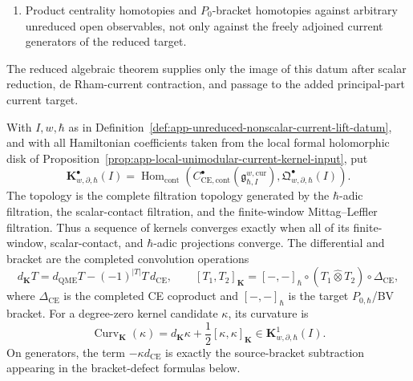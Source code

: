\begin{defn}
\begin{enumerate}
    filtered chain projection
    \[
      \widehat\sigma_{\mathrm{sc}}\colon
      \mathfrak Q^\bullet_{w,\partial,\hbar}(I)
      \longrightarrow
      C^\bullet_{\mathrm{Lie}}(\bar A;\C\gamma_{\mathbf 1})[1][[\hbar]]
    \]
    whose associated graded is the scalar-symbol map of
    Definition~\ref{def:app-scalar-obstruction-complex}.
    \item Product centrality homotopies and \(P_0\)-bracket homotopies
    against arbitrary unreduced open observables, not only against the
    freely adjoined current generators of the reduced target.
  \end{enumerate}
  The reduced algebraic theorem supplies only the image of this datum
  after scalar reduction, de Rham-current contraction, and passage to the
  added principal-part current target.
\end{defn}

\begin{defn}
\label{def:app-bulk-defect-convolution-habitat}
  With \(I,w,\hbar\) as in
  Definition~\ref{def:app-unreduced-nonscalar-current-lift-datum}, and
  with all Hamiltonian coefficients taken from the local formal
  holomorphic disk of
  Proposition~\ref{prop:app-local-unimodular-current-kernel-input}, put
  \[
    \mathbf K^\bullet_{w,\partial,\hbar}(I)
      =
      \operatorname{Hom}_{\mathrm{cont}}\!\left(
      C^\bullet_{\mathrm{CE},\mathrm{cont}}
      (\mathfrak g^{w,\mathrm{cur}}_{\hbar,I}),
      \mathfrak Q^\bullet_{w,\partial,\hbar}(I)\right).
  \]
  The topology is the complete filtration topology generated by the
  \(\hbar\)-adic filtration, the scalar-contact filtration, and the
  finite-window Mittag--Leffler filtration.  Thus a sequence of kernels
  converges exactly when all of its finite-window, scalar-contact, and
  \(\hbar\)-adic projections converge.  The differential and bracket are
  the completed convolution operations
  \[
    d_{\mathbf K}T=d_{\mathrm{QME}}T-(-1)^{|T|}T\,d_{\mathrm{CE}},
    \qquad
    [T_1,T_2]_{\mathbf K}
      =[-,-]_{\hbar}\circ(T_1\widehat\otimes T_2)\circ\Delta_{\mathrm{CE}},
  \]
  where \(\Delta_{\mathrm{CE}}\) is the completed CE coproduct and
  \([-,-]_{\hbar}\) is the target \(P_{0,\hbar}\)/BV bracket.  For a
  degree-zero kernel candidate \(\kappa\), its curvature is
  \[
    \operatorname{Curv}_{\mathbf K}(\kappa)
      =
      d_{\mathbf K}\kappa
      +\frac12[\kappa,\kappa]_{\mathbf K}
      \in \mathbf K^1_{w,\partial,\hbar}(I).
  \]
  On generators, the term \(-\kappa d_{\mathrm{CE}}\) is exactly the
  source-bracket subtraction appearing in the bracket-defect formulas
  below.
\end{defn}

